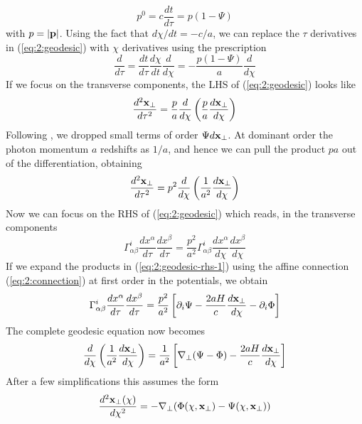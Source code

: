 \begin{equation}
\label{eq:2:nullconstr}
p^0 = c\frac{dt}{d\tau} = p(1-\Psi)
\end{equation} 
%
with $p=\vert\mathbf{p}\vert$. Using the fact that $d\chi/dt = -c/a$, we can replace the $\tau$ derivatives in (\ref{eq:2:geodesic}) with $\chi$ derivatives using the prescription
\begin{equation}
\label{eq:2:tau2chi}
\frac{d}{d\tau} = \frac{dt}{d\tau}\frac{d\chi}{dt}\frac{d}{d\chi} = -\frac{p(1-\Psi)}{a}\frac{d}{d\chi}
\end{equation}
%
If we focus on the transverse components, the LHS of (\ref{eq:2:geodesic}) looks like
\begin{equation}
\label{eq:2:geodesic-lhs-1}
\frac{d^2\mathbf{x}_\perp}{d\tau^2} = \frac{p}{a}\frac{d}{d\chi}\left(\frac{p}{a}\frac{d\mathbf{x}_\perp}{d\chi}\right)
\end{equation}
%
Following \citep{Dodelson-C11}, we dropped small terms of order $\Psi d\mathbf{x}_\perp$. At dominant order the photon momentum $a$ redshifts as $1/a$, and hence we can pull the product $pa$ out of the differentiation, obtaining 
\begin{equation}
\label{eq:2:geodesic-lhs-2}
\frac{d^2\mathbf{x}_\perp}{d\tau^2} = p^2\frac{d}{d\chi}\left(\frac{1}{a^2}\frac{d\mathbf{x}_\perp}{d\chi}\right)
\end{equation}
%
Now we can focus on the RHS of (\ref{eq:2:geodesic}) which reads, in the transverse components
\begin{equation}
\label{eq:2:geodesic-rhs-1}
\Gamma_{\alpha\beta}^i \frac{d x^\alpha}{d\tau}\frac{d x^\beta}{d\tau} = \frac{p^2}{a^2} \Gamma_{\alpha\beta}^i \frac{d x^\alpha}{d\chi}\frac{d x^\beta}{d\chi}
\end{equation}
%
If we expand the products in (\ref{eq:2:geodesic-rhs-1}) using the affine connection (\ref{eq:2:connection}) at first order in the potentials, we obtain
\begin{equation}
\label{eq:2:geodesic-rhs-2}
\Gamma_{\alpha\beta}^i \frac{d x^\alpha}{d\tau}\frac{d x^\beta}{d\tau} = \frac{p^2}{a^2}\left[\partial_i\Psi-\frac{2aH}{c}\frac{d\mathbf{x}_\perp}{d\chi} -\partial_i\Phi \right]
\end{equation}
%
The complete geodesic equation now becomes 
\begin{equation}
\label{eq:2:geodesic-fo-1}
\frac{d}{d\chi}\left(\frac{1}{a^2}\frac{d\mathbf{x}_\perp}{d\chi}\right) = \frac{1}{a^2}\left[\nabla_\perp(\Psi-\Phi)-\frac{2aH}{c}\frac{d\mathbf{x}_\perp}{d\chi}\right]
\end{equation}
%
After a few simplifications this assumes the form 
\begin{equation}
\label{eq:2:geodesic-fo-2}
\frac{d^2\mathbf{x}_\perp(\chi)}{d\chi^2} = -\nabla_\perp(\Phi(\chi,\mathbf{x}_\perp)-\Psi(\chi,\mathbf{x}_\perp))
\end{equation}

